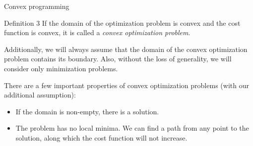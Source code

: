 \documentclass{beamer}
\begin{document}
\begin{frame}{Convex programming}
	\begin{flushleft}
		
		\begin{block}{Definition 3}
			If the domain of the optimization problem is convex and the cost function is convex, it is called a \emph{convex optimization problem}.
		\end{block}
		
		\bigskip
		
		Additionally, we will always assume that the domain of the convex optimization problem contains its boundary. Also, without the loss of generality, we will consider only minimization problems.
		
		\bigskip
		
		There are a few important properties of convex optimization problems (with our additional assumption):
		
		\begin{itemize}
			\item If the domain is non-empty, there is a solution.
			\item The problem has no local minima. We can find a path from any point to the solution, along which the cost function will not increase.
		\end{itemize}
		
	\end{flushleft}
\end{frame}




\myqrframe
\end{document}
